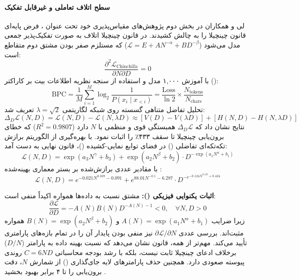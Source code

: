 \paragraph*{سطح اتلاف تعاملی و غیرقابل تفکیک }
لی و همکاران در بخش دوم پژوهش‌های مقیاس‌پذیری خود تحت عنوان  \cite{li2025farseer}، فرض پایه‌ای قانون چینچیلا را به چالش کشیدند. در قانون چینچیلا اتلاف به صورت تفکیک‌پذیر جمعی مدل می‌شود ($\mathcal{L} = E + A N^{-\alpha} + B D^{-\beta}$) که مستلزم صفر بودن مشتق دوم متقاطع است:
\begin{equation}
    \frac{\partial^2 \mathcal{L}_{\text{Chinchilla}}}{\partial N \partial D} = 0
\end{equation}
با آموزش ۱,۰۰۰ مدل و استفاده از سنجه نظریه اطلاعات بیت بر کاراکتر ():
\begin{equation}
    \text{BPC} = \frac{1}{M} \sum_{i=1}^M \log_2 \frac{1}{P(x_i \mid x_{<i})} = \frac{\text{Loss}}{\ln 2} \times \frac{N_{\text{tokens}}}{N_{\text{chars}}}
\end{equation}
تحلیل تفاضل متناهی گسسته روی شبکه لگاریتمی $\lambda = \sqrt{2}$ تعریف شد:
\begin{equation}
    \Delta_D \mathcal{L}(N, D) = \mathcal{L}(N, D) - \mathcal{L}(N, \lambda D) \approx [V(D) - V(\lambda D)] + [H(N, D) - H(N, \lambda D)]
\end{equation}
نتایج نشان داد که $\Delta_D \mathcal{L}$ همبستگی قوی و منظمی با $N$ دارد ($R^2 = 0.9807$) که خطای برون‌یابی چینچیلا تا سقف ۴۳۳٪ را اثبات نمود. با بهره‌گیری از الگوریتم برازش تکه‌تکه‌ای تفاضلی () در فضای توابع نمایی-کشیده ()، قانون نهایی  به دست آمد:
\begin{equation}
    \mathcal{L}(N, D) = \exp\left(a_3 N^\gamma + b_3\right) + \exp\left(a_2 N^\beta + b_2\right) \cdot D^{-\exp\left(a_1 N^\alpha + b_1\right)}
\end{equation}
با مقادیر عددی برازش‌شده بر بستر معماری بهینه‌شده :
\begin{equation}
    \mathcal{L}(N, D) = e^{-0.021 N^{0.169} - 0.091} + e^{88.01 N^{-0.1} - 6.287} \cdot D^{-e^{-0.124 N^{0.123} + 0.424}}
\end{equation}

\noindent
\textbf{اثبات یکنوایی فیزیکی ():} مشتق نسبت به داده‌ها همواره اکیداً منفی است:
\begin{equation}
    \frac{\partial \mathcal{L}}{\partial D} = - A(N) B(N) D^{-A(N) - 1} < 0, \quad \forall N, D > 0
\end{equation}
زیرا ضرایب $A(N) = \exp(a_1 N^\alpha + b_1)$ و $B(N) = \exp(a_2 N^\beta + b_2)$ همواره مثبت‌اند. بررسی عددی $\partial \mathcal{L}/\partial N$ نیز منفی بودن پایدار آن را در تمام بازه‌های پارامتری تأیید می‌کند. مهم‌تر از همه، قانون  نشان می‌دهد که نسبت بهینه داده به پارامتر ($D/N$) برخلاف ادعای چینچیلا ثابت نیست، بلکه با رشد بودجه محاسباتی $C = 6ND$ روندی پیوسته صعودی دارد. همچنین حذف پارامترهای لایه جای‌گذاری () از شمارش $N$، دقت برون‌یابی را تا ۴ برابر بهبود بخشید \cite{li2025farseer}.

